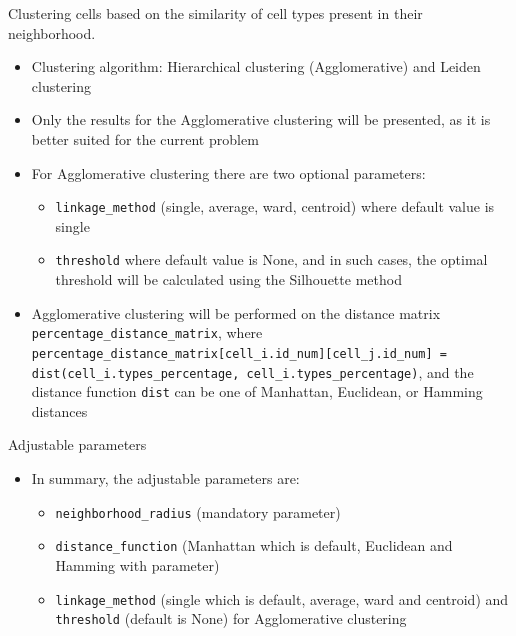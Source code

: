 \documentclass{beamer}
\begin{document}
\begin{frame}{Clustering cells based on the similarity of cell types present in their neighborhood.}

\begin{itemize}
    \item<1-> Clustering algorithm:  Hierarchical clustering (Agglomerative) and Leiden clustering
    \item<2-> Only the results for the Agglomerative clustering will be presented, as it is better suited for the current problem
    \item<3-> For Agglomerative clustering there are two optional parameters:
    \begin{itemize}
        \item<4-> \texttt{linkage\_method} (single, average, ward, centroid) where default value is single
        \item<5-> \texttt{threshold} where default value is None, and in such cases, the optimal threshold will be calculated using the Silhouette method
    \end{itemize}
    \item<6-> Agglomerative clustering will be performed on the distance matrix \texttt{percentage\_distance\_matrix}, where \texttt{percentage\_distance\_matrix[cell\_i.id\_num][cell\_j.id\_num] = dist(cell\_i.types\_percentage, cell\_i.types\_percentage)}, and the distance function \texttt{dist} can be one of Manhattan, Euclidean, or Hamming distances
\end{itemize}

\end{frame}
\begin{frame}{Adjustable parameters}

\begin{itemize}
    \item<1-> In summary, the adjustable parameters are:
    \begin{itemize}
        \item<2-> \texttt{neighborhood\_radius} (mandatory parameter)
        \item<3-> \texttt{distance\_function} (Manhattan which is default, Euclidean and Hamming with parameter)
        \item<4-> \texttt{linkage\_method} (single which is default, average, ward and centroid) and \texttt{threshold} (default is None) for Agglomerative clustering
    \end{itemize}
\end{itemize}

\end{frame}
\end{document}
